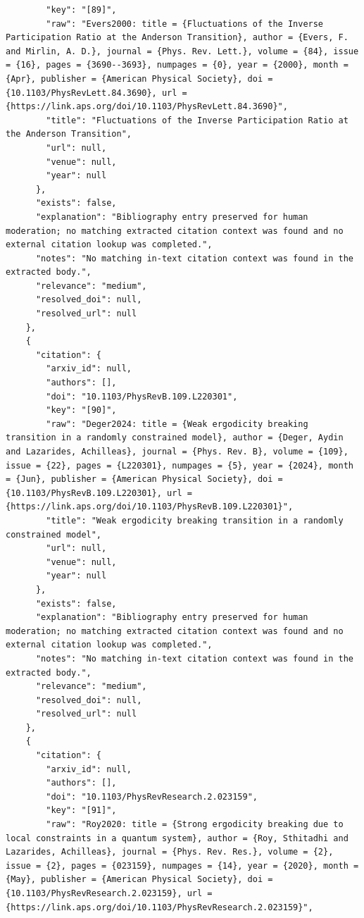 \documentclass[11pt]{article}
\begin{document}
\begin{verbatim}
        "key": "[89]",
        "raw": "Evers2000: title = {Fluctuations of the Inverse Participation Ratio at the Anderson Transition}, author = {Evers, F. and Mirlin, A. D.}, journal = {Phys. Rev. Lett.}, volume = {84}, issue = {16}, pages = {3690--3693}, numpages = {0}, year = {2000}, month = {Apr}, publisher = {American Physical Society}, doi = {10.1103/PhysRevLett.84.3690}, url = {https://link.aps.org/doi/10.1103/PhysRevLett.84.3690}",
        "title": "Fluctuations of the Inverse Participation Ratio at the Anderson Transition",
        "url": null,
        "venue": null,
        "year": null
      },
      "exists": false,
      "explanation": "Bibliography entry preserved for human moderation; no matching extracted citation context was found and no external citation lookup was completed.",
      "notes": "No matching in-text citation context was found in the extracted body.",
      "relevance": "medium",
      "resolved_doi": null,
      "resolved_url": null
    },
    {
      "citation": {
        "arxiv_id": null,
        "authors": [],
        "doi": "10.1103/PhysRevB.109.L220301",
        "key": "[90]",
        "raw": "Deger2024: title = {Weak ergodicity breaking transition in a randomly constrained model}, author = {Deger, Aydin and Lazarides, Achilleas}, journal = {Phys. Rev. B}, volume = {109}, issue = {22}, pages = {L220301}, numpages = {5}, year = {2024}, month = {Jun}, publisher = {American Physical Society}, doi = {10.1103/PhysRevB.109.L220301}, url = {https://link.aps.org/doi/10.1103/PhysRevB.109.L220301}",
        "title": "Weak ergodicity breaking transition in a randomly constrained model",
        "url": null,
        "venue": null,
        "year": null
      },
      "exists": false,
      "explanation": "Bibliography entry preserved for human moderation; no matching extracted citation context was found and no external citation lookup was completed.",
      "notes": "No matching in-text citation context was found in the extracted body.",
      "relevance": "medium",
      "resolved_doi": null,
      "resolved_url": null
    },
    {
      "citation": {
        "arxiv_id": null,
        "authors": [],
        "doi": "10.1103/PhysRevResearch.2.023159",
        "key": "[91]",
        "raw": "Roy2020: title = {Strong ergodicity breaking due to local constraints in a quantum system}, author = {Roy, Sthitadhi and Lazarides, Achilleas}, journal = {Phys. Rev. Res.}, volume = {2}, issue = {2}, pages = {023159}, numpages = {14}, year = {2020}, month = {May}, publisher = {American Physical Society}, doi = {10.1103/PhysRevResearch.2.023159}, url = {https://link.aps.org/doi/10.1103/PhysRevResearch.2.023159}",

\end{verbatim}
\end{document}
